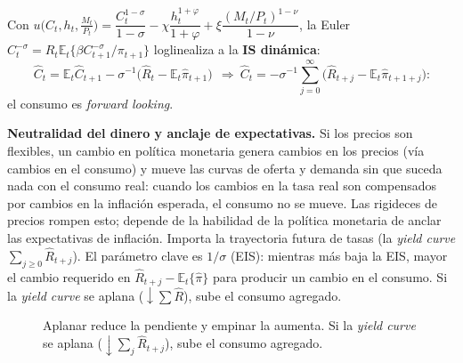 \documentclass[11pt]{article}
\renewcommand{\boxed}[1]{#1}     %
\newenvironment{notabox}[1][Nota]%
  {\par\medskip\noindent\textbf{#1.}\enspace\ignorespaces}%
  {\par\medskip}
\theoremstyle{definition}
\newcommand{\E}{\mathbb{E}}
\begin{document}
Con
$u\big(C_{t},h_{t},\tfrac{M_{t}}{P_{t}}\big)
=\dfrac{C_{t}^{1-\sigma}}{1-\sigma}-\chi\dfrac{h_{t}^{1+\varphi}}{1+\varphi}
+\xi\dfrac{(M_{t}/P_{t})^{1-\nu}}{1-\nu}$,
la Euler $C_{t}^{-\sigma}=R_{t}\E_{t}\{\beta C_{t+1}^{-\sigma}/\pi_{t+1}\}$ loglinealiza a la
\textbf{IS dinámica}:
\begin{equation}
\boxed{\ \widehat{C}_{t}=\E_{t}\widehat{C}_{t+1}-\sigma^{-1}\big(\widehat{R}_{t}-\E_{t}\widehat{\pi}_{t+1}\big)\ }
\ \Longrightarrow\
\widehat{C}_{t}=-\sigma^{-1}\sum_{j=0}^{\infty}\big(\widehat{R}_{t+j}-\E_{t}\widehat{\pi}_{t+1+j}\big):
\end{equation}
el consumo es \emph{forward looking}.

\begin{notabox}[Neutralidad del dinero y anclaje de expectativas]
Si los precios son flexibles, un cambio en política monetaria genera cambios en los precios (vía
cambios en el consumo) y mueve las curvas de oferta y demanda sin que suceda nada con el consumo
real: cuando los cambios en la tasa real son compensados por cambios en la inflación esperada, el
consumo no se mueve. Las rigideces de precios rompen esto; depende de la habilidad de la política
monetaria de anclar las expectativas de inflación. Importa la trayectoria futura de tasas (la
\emph{yield curve} $\sum_{j\ge0}\widehat{R}_{t+j}$). El parámetro clave es $1/\sigma$ (EIS): mientras
más baja la EIS, mayor el cambio requerido en $\widehat{R}_{t+j}-\E_{t}\{\widehat{\pi}\}$ para producir
un cambio en el consumo. Si la \emph{yield curve} se aplana ($\downarrow\sum\widehat{R}$), sube el
consumo agregado.
\end{notabox}

\begin{figure}[h]
\centering
{}
\caption{Aplanar reduce la pendiente y empinar la aumenta. Si la \emph{yield curve} se aplana
($\downarrow\sum_{j}\widehat{R}_{t+j}$), sube el consumo agregado.}
\end{figure}
\end{document}
